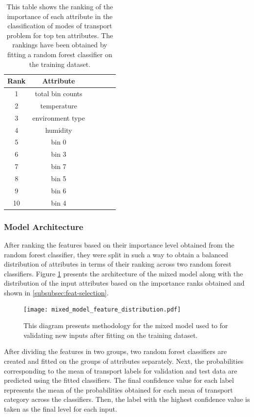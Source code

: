 \documentclass[bsc,frontabs,twoside,singlespacing, parskip,deptreport]{infthesis}     %
\begin{document}
\begin{table}[h!]
\centering
 \begin{tabular}{||c | c | c | c | c | c||} 
 \hline
 Rank & Attribute \\ [0.5ex] 
 \hline\hline
 1 & total bin counts \\ 
 \hline
 2 &  temperature \\
 \hline
 3 &  environment type \\
  \hline
 4 &  humidity \\
  \hline
 5 &  bin 0 \\
  \hline
 6 &  bin 3 \\
  \hline
 7 &  bin 7 \\
 \hline
 8 & bin 5 \\
  \hline
 9 &  bin 6 \\ 
  \hline
 10 &  bin 4 \\
 \hline
 
\end{tabular}
\caption{This table shows the ranking of the importance of each attribute in the classification of modes of transport problem for top ten attributes. The rankings have been obtained by fitting a random forest classifier on the training dataset.}
\label{table:attr-rank}
\end{table}


\subsubsection{Model Architecture}

After ranking the features based on their importance level obtained from the random forest classifier, they were split in such a way to obtain a balanced distribution of attributes in terms of their ranking across two random forest classifiers. Figure \ref{fig:mixed_model_feature_distribution} presents the architecture of the mixed model along with the distribution of the input attributes based on the importance ranks obtained and shown in \ref{subsubsec:feat-selection}.

\begin{figure}[h!]
  \center
  \texttt{[image: mixed\_model\_feature\_distribution.pdf]}
  \caption{This diagram presents methodology for the mixed model used to for validating new inputs after fitting on the training dataset.}
  \label{fig:mixed_model_feature_distribution}
\end{figure}

After dividing the features in two groups, two random forest classifiers are created and fitted on the groups of attributes separately. Next, the probabilities corresponding to the mean of transport labels for validation and test data are predicted using the fitted classifiers. The final confidence value for each label represents the mean of the probabilities obtained for each mean of transport category across the classifiers. Then, the label with the highest confidence value is taken as the final level for each input.
\end{document}

